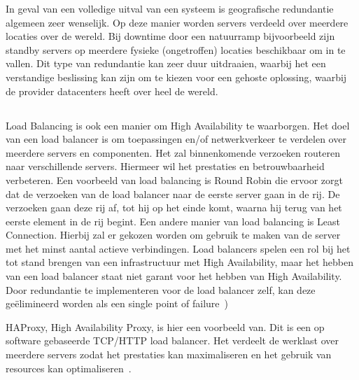 In geval van een volledige uitval van een systeem is geografische redundantie algemeen zeer wenselijk. Op deze manier worden servers verdeeld over meerdere locaties over de wereld. Bij downtime door een natuurramp bijvoorbeeld zijn standby servers op meerdere fysieke (ongetroffen) locaties beschikbaar om in te vallen. Dit type van redundantie kan zeer duur uitdraaien, waarbij het een verstandige beslissing kan zijn om te kiezen voor een gehoste oplossing, waarbij de provider datacenters heeft over heel de wereld.

\subsection{}
\label{subsec:Load Balancing}

Load Balancing is ook een manier om High Availability te waarborgen. Het doel van een load balancer is om toepassingen en/of netwerkverkeer te verdelen over meerdere servers en componenten. Het zal binnenkomende verzoeken routeren naar verschillende servers. Hiermeer wil het prestaties en betrouwbaarheid verbeteren. Een voorbeeld van load balancing is Round Robin die ervoor zorgt dat de verzoeken van de load balancer naar de eerste server gaan in de rij. De verzoeken gaan deze rij af, tot hij op het einde komt, waarna hij terug van het eerste element in de rij begint. Een andere manier van load balancing is Least Connection. Hierbij zal er gekozen worden om gebruik te maken van de server met het minst aantal actieve verbindingen. Load balancers spelen een rol bij het tot stand brengen van een infrastructuur met High Availability, maar het hebben van een load balancer staat niet garant voor het hebben van High Availability. Door redundantie te implementeren voor de load balancer zelf, kan deze geëlimineerd worden als een single point of failure~\autocite{Jevtic2018})

HAProxy, High Availability Proxy, is hier een voorbeeld van. Dit is een op software gebaseerde TCP/HTTP load balancer. Het verdeelt de werklast over meerdere servers zodat het prestaties kan maximaliseren en het gebruik van resources kan optimaliseren~\autocite{SeveralNines2020}.

\subsection{}
\label{subsec:Schaalbaarheid}

